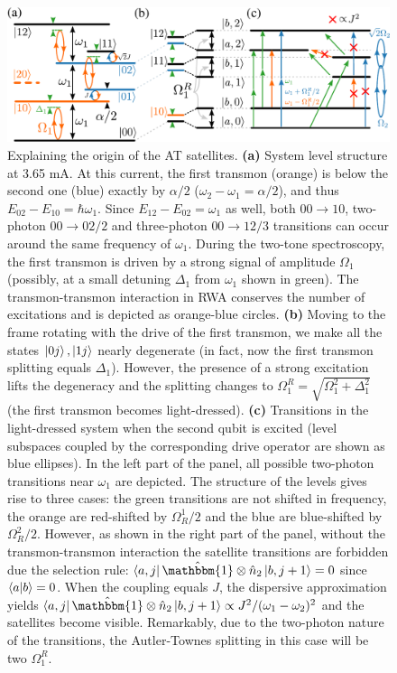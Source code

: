 \documentclass[%
 aip,
 amsmath,amssymb,
 reprint,%
]{revtex4-1}
\begin{document}
\begin{figure}
	\centering
	\includegraphics[width=.9\linewidth]{main_scheme}
	\caption{Explaining the origin of the AT satellites. \textbf{(a)} System level structure at 3.65 mA. At this current, the first transmon (orange) is below the second one (blue) exactly by $\alpha/2$ ($\omega_2 - \omega_1 = \alpha/2$), and thus $E_{02} - E_{10} = \hbar\omega_1$. Since $E_{12} - E_{02} = \omega_1$ as well, both $00\rightarrow 10$, two-photon $00 \rightarrow 02/2$ and three-photon $00\rightarrow 12/3$ transitions can occur around the same frequency of $\omega_1$. During the two-tone spectroscopy, the first transmon is driven by a strong signal of amplitude $\Omega_1$ (possibly, at a small detuning $\Delta_1$ from $\omega_1$ shown in green). The transmon-transmon interaction in RWA conserves the number of excitations and is depicted as orange-blue circles. \textbf{(b)} Moving to the frame rotating with the drive of the first transmon, we make all the states $\ket{0j},\ket{1j}$ nearly degenerate (in fact, now the first transmon splitting equals $\Delta_1$). However, the presence of a strong excitation lifts the degeneracy and the splitting changes to $\Omega_1^R = \sqrt{\Omega_1^2 + \Delta_1^2}$ (the first transmon becomes light-dressed). \textbf{(c)} Transitions in the light-dressed system when the second qubit is excited (level subspaces coupled by the corresponding drive operator are shown as blue ellipses). In the left part of the panel, all possible two-photon transitions near $\omega_1$ are depicted. The structure of the levels gives rise to three cases: the green transitions are not shifted in frequency, the orange are red-shifted by $\Omega_R^1/2$ and the blue are blue-shifted by $\Omega_R^2/2$. However, as shown in the right part of the panel, without the transmon-transmon interaction the satellite transitions are forbidden due the selection rule: $\bra{a,j}\hat{\mathbbm{1}}\otimes \hat n_2 \ket{b, j+1} = 0$ since $\braket{a}{b} = 0$. When the coupling equals $J$, the dispersive approximation yields $\bra{a,j}\hat{\mathbbm{1}}\otimes \hat n_2\ket{b, j+1}\propto J^2/(\omega_1-\omega_2)^2$ and the satellites become visible. Remarkably, due to the two-photon nature of the transitions, the Autler-Townes splitting in this case will be two $\Omega_1^R$.}
	\label{fig:main_scheme}
\end{figure}
\end{document}
